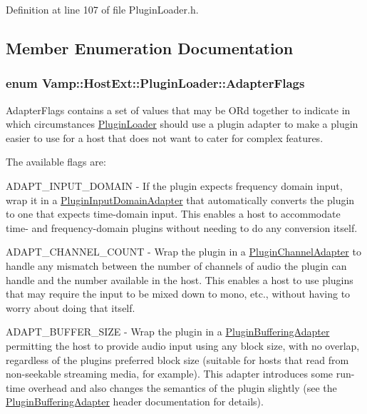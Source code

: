 Definition at line 107 of file Plugin\+Loader.\+h.



\subsection{Member Enumeration Documentation}
\subsubsection[{\texorpdfstring{Adapter\+Flags}{AdapterFlags}}]{\setlength{\rightskip}{0pt plus 5cm}enum {\bf Vamp\+::\+Host\+Ext\+::\+Plugin\+Loader\+::\+Adapter\+Flags}}\hypertarget{class_vamp_1_1_host_ext_1_1_plugin_loader_aff3ee11692ce25e0dfb904324cbe3494}{}\label{class_vamp_1_1_host_ext_1_1_plugin_loader_aff3ee11692ce25e0dfb904324cbe3494}
Adapter\+Flags contains a set of values that may be OR\textquotesingle{}d together to indicate in which circumstances \hyperlink{class_vamp_1_1_host_ext_1_1_plugin_loader}{Plugin\+Loader} should use a plugin adapter to make a plugin easier to use for a host that does not want to cater for complex features.

The available flags are\+:

A\+D\+A\+P\+T\+\_\+\+I\+N\+P\+U\+T\+\_\+\+D\+O\+M\+A\+IN -\/ If the plugin expects frequency domain input, wrap it in a \hyperlink{class_vamp_1_1_host_ext_1_1_plugin_input_domain_adapter}{Plugin\+Input\+Domain\+Adapter} that automatically converts the plugin to one that expects time-\/domain input. This enables a host to accommodate time-\/ and frequency-\/domain plugins without needing to do any conversion itself.

A\+D\+A\+P\+T\+\_\+\+C\+H\+A\+N\+N\+E\+L\+\_\+\+C\+O\+U\+NT -\/ Wrap the plugin in a \hyperlink{class_vamp_1_1_host_ext_1_1_plugin_channel_adapter}{Plugin\+Channel\+Adapter} to handle any mismatch between the number of channels of audio the plugin can handle and the number available in the host. This enables a host to use plugins that may require the input to be mixed down to mono, etc., without having to worry about doing that itself.

A\+D\+A\+P\+T\+\_\+\+B\+U\+F\+F\+E\+R\+\_\+\+S\+I\+ZE -\/ Wrap the plugin in a \hyperlink{class_vamp_1_1_host_ext_1_1_plugin_buffering_adapter}{Plugin\+Buffering\+Adapter} permitting the host to provide audio input using any block size, with no overlap, regardless of the plugin\textquotesingle{}s preferred block size (suitable for hosts that read from non-\/seekable streaming media, for example). This adapter introduces some run-\/time overhead and also changes the semantics of the plugin slightly (see the \hyperlink{class_vamp_1_1_host_ext_1_1_plugin_buffering_adapter}{Plugin\+Buffering\+Adapter} header documentation for details).


